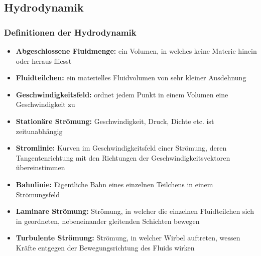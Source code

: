 
\newpage
\subsection{Hydrodynamik}
	\subsubsection{Definitionen der Hydrodynamik}
		\begin{minipage}{19cm}
			\begin{itemize}
				\item \textbf{Abgeschlossene Fluidmenge:} ein Volumen, in welches keine Materie hinein oder heraus fliesst
				\item \textbf{Fluidteilchen:} ein materielles Fluidvolumen von sehr kleiner Ausdehnung
				\item \textbf{Geschwindigkeitsfeld:} ordnet jedem Punkt in einem Volumen eine Geschwindigkeit zu
				\item \textbf{Stationäre Strömung:} Geschwindigkeit, Druck, Dichte etc. ist zeitunabhängig
				\item \textbf{Stromlinie:} Kurven im Geschwindigkeitsfeld einer Strömung, deren Tangentenrichtung mit den Richtungen der Geschwindigkeitsvektoren übereinstimmen
				\item \textbf{Bahnlinie:} Eigentliche Bahn eines einzelnen Teilchens in einem Strömungsfeld
				\item \textbf{Laminare Strömung:} Strömung, in welcher die einzelnen Fluidteilchen sich in geordneten, nebeneinander gleitenden Schichten bewegen
				\item \textbf{Turbulente Strömung:} Strömung, in welcher Wirbel auftreten, wessen Kräfte entgegen der Bewegungsrichtung des Fluids wirken
			\end{itemize}
		\end{minipage}
	
